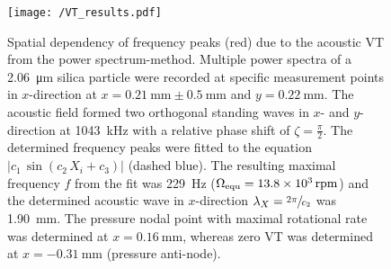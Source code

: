 \begin{figure}[tb]
  \centering
  \texttt{[image: /VT\_results.pdf]}




    \caption{Spatial dependency of frequency peaks (red) due to the acoustic VT 
      from the power spectrum-method. Multiple power spectra of a 
      \SI{2.06}{\micro\meter} silica particle were recorded at specific 
      measurement points in $x$-direction at $x=\SI{0.21}{\mm}\pm\SI{0.5}{\mm}$ 
      and $y=\SI{0.22}{\mm}$. The acoustic field formed two orthogonal standing 
      waves in $x$- and $y$-direction at \SI{1043}{\kilo\hertz} with a relative 
      phase shift of $\zeta =\frac{\pi}{2}$. The determined frequency peaks were 
      fitted to the equation $\left|c_{1}\,\sin(c_2\,X_i + c_3)\right|$ (dashed 
      blue).  The resulting maximal frequency $f$  from the fit was 
      \SI{229}{\hertz} ($ \Omega_{\mathrm{equ}} = \SI{13.8e3}{rpm}$) and the determined 
      acoustic wave in $x$-direction $\lambda_{X}=\sfrac{2\pi}{c_2}$ was 
    \SI{1.90}{\mm}. The pressure nodal point with maximal rotational rate was 
  determined at $x=\SI{0.16}{\mm}$, whereas zero VT was determined at 
$x=\SI{-0.31}{\mm}$ (pressure anti-node).\label{fig:VT-Fig10}}
\end{figure}
